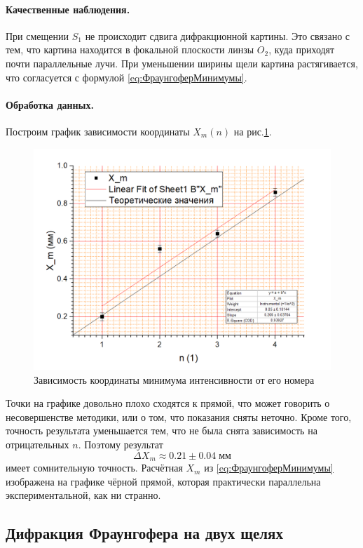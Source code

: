 \documentclass[a4paper]{article}
\begin{document}
\paragraph{Качественные наблюдения.}

При смещении $ S_1 $ не происходит сдвига дифракционной картины. Это связано с тем, что картина находится в фокальной плоскости линзы $ O_2 $, куда приходят почти параллельные лучи.
При уменьшении ширины щели картина растягивается, что согласуется с формулой \eqref{eq:ФраунгоферМинимумы}.

\paragraph{Обработка данных.}

Построим график зависимости координаты $ X_m (n) $ на рис.\ref{fig:странныйграфик}.
\begin{figure}[tbp]
	\centering
	\includegraphics[width=0.8\linewidth]{Screenshot_8}
	\caption{Зависимость координаты минимума интенсивности от его номера}
	\label{fig:странныйграфик}
\end{figure}
Точки на графике довольно плохо сходятся к прямой, что может говорить о несовершенстве методики, или о том, что показания сняты неточно. Кроме того, точность результата уменьшается тем, что не была снята зависимость на отрицательных $ n $.
Поэтому результат
\begin{equation*}\label{key}
	\Delta X_m \approx 0.21\pm 0.04 \; мм
\end{equation*}
имеет сомнительную точность.
Расчётная $ X_m $ из \eqref{eq:ФраунгоферМинимумы} изображена на графике чёрной прямой, которая практически параллельна экспериментальной, как ни странно.

\subsection{Дифракция Фраунгофера на двух щелях}
\end{document}
